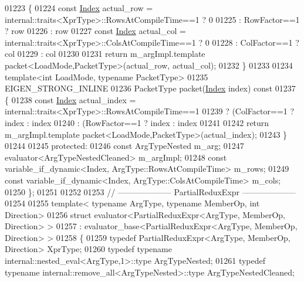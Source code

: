 \begin{DoxyCode}
01223 \textcolor{keyword}{  }\{
01224     \textcolor{keyword}{const} \hyperlink{namespace_eigen_a62e77e0933482dafde8fe197d9a2cfde}{Index} actual\_row = internal::traits<XprType>::RowsAtCompileTime==1 ? 0
01225                            : RowFactor==1 ? row
01226                            : row %
01227     \textcolor{keyword}{const} \hyperlink{namespace_eigen_a62e77e0933482dafde8fe197d9a2cfde}{Index} actual\_col = internal::traits<XprType>::ColsAtCompileTime==1 ? 0
01228                            : ColFactor==1 ? col
01229                            : col %
01230 
01231     \textcolor{keywordflow}{return} m\_argImpl.template packet<LoadMode,PacketType>(actual\_row, actual\_col);
01232   \}
01233   
01234   \textcolor{keyword}{template}<\textcolor{keywordtype}{int} LoadMode, \textcolor{keyword}{typename} PacketType>
01235   EIGEN\_STRONG\_INLINE
01236   PacketType packet(\hyperlink{namespace_eigen_a62e77e0933482dafde8fe197d9a2cfde}{Index} index)\textcolor{keyword}{ const}
01237 \textcolor{keyword}{  }\{
01238     \textcolor{keyword}{const} \hyperlink{namespace_eigen_a62e77e0933482dafde8fe197d9a2cfde}{Index} actual\_index = internal::traits<XprType>::RowsAtCompileTime==1
01239                                   ? (ColFactor==1 ?  index : index%
01240                                   : (RowFactor==1 ?  index : index%
01241 
01242     \textcolor{keywordflow}{return} m\_argImpl.template packet<LoadMode,PacketType>(actual\_index);
01243   \}
01244  
01245 \textcolor{keyword}{protected}:
01246   \textcolor{keyword}{const} ArgTypeNested m\_arg;
01247   evaluator<ArgTypeNestedCleaned> m\_argImpl;
01248   \textcolor{keyword}{const} variable\_if\_dynamic<Index, ArgType::RowsAtCompileTime> m\_rows;
01249   \textcolor{keyword}{const} variable\_if\_dynamic<Index, ArgType::ColsAtCompileTime> m\_cols;
01250 \};
01251 
01252 
01253 \textcolor{comment}{// -------------------- PartialReduxExpr --------------------}
01254 
01255 \textcolor{keyword}{template}< \textcolor{keyword}{typename} ArgType, \textcolor{keyword}{typename} MemberOp, \textcolor{keywordtype}{int} Direction>
01256 \textcolor{keyword}{struct }evaluator<PartialReduxExpr<ArgType, MemberOp, Direction> >
01257   : evaluator\_base<PartialReduxExpr<ArgType, MemberOp, Direction> >
01258 \{
01259   \textcolor{keyword}{typedef} PartialReduxExpr<ArgType, MemberOp, Direction> XprType;
01260   \textcolor{keyword}{typedef} \textcolor{keyword}{typename} internal::nested\_eval<ArgType,1>::type ArgTypeNested;
01261   \textcolor{keyword}{typedef} \textcolor{keyword}{typename} internal::remove\_all<ArgTypeNested>::type ArgTypeNestedCleaned;

\end{DoxyCode}
